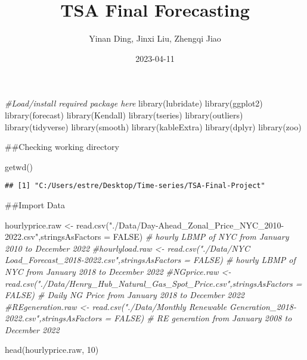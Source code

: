 \documentclass[
]{article}
\title{TSA Final Forecasting}
\author{Yinan Ding, Jinxi Liu, Zhengqi Jiao}
\date{2023-04-11}
\newenvironment{Shaded}{\begin{snugshade}}{\end{snugshade}}
\newcommand{\AttributeTok}[1]{\textcolor[rgb]{0.77,0.63,0.00}{#1}}
\newcommand{\CommentTok}[1]{\textcolor[rgb]{0.56,0.35,0.01}{\textit{#1}}}
\newcommand{\ConstantTok}[1]{\textcolor[rgb]{0.00,0.00,0.00}{#1}}
\newcommand{\DecValTok}[1]{\textcolor[rgb]{0.00,0.00,0.81}{#1}}
\newcommand{\FunctionTok}[1]{\textcolor[rgb]{0.00,0.00,0.00}{#1}}
\newcommand{\NormalTok}[1]{#1}
\newcommand{\OtherTok}[1]{\textcolor[rgb]{0.56,0.35,0.01}{#1}}
\newcommand{\StringTok}[1]{\textcolor[rgb]{0.31,0.60,0.02}{#1}}
\begin{document}
\maketitle

\begin{Shaded}
\begin{Highlighting}[]
\CommentTok{\#Load/install required package here}
\FunctionTok{library}\NormalTok{(lubridate)}
\FunctionTok{library}\NormalTok{(ggplot2)}
\FunctionTok{library}\NormalTok{(forecast)  }
\FunctionTok{library}\NormalTok{(Kendall)}
\FunctionTok{library}\NormalTok{(tseries)}
\FunctionTok{library}\NormalTok{(outliers)}
\FunctionTok{library}\NormalTok{(tidyverse)}
\FunctionTok{library}\NormalTok{(smooth)}
\FunctionTok{library}\NormalTok{(kableExtra)}
\FunctionTok{library}\NormalTok{(dplyr)}
\FunctionTok{library}\NormalTok{(zoo)}
\end{Highlighting}
\end{Shaded}

\#\#Checking working directory

\begin{Shaded}
\begin{Highlighting}[]
\FunctionTok{getwd}\NormalTok{()}
\end{Highlighting}
\end{Shaded}

\begin{verbatim}
## [1] "C:/Users/estre/Desktop/Time-series/TSA-Final-Project"
\end{verbatim}

\#\#Import Data

\begin{Shaded}
\begin{Highlighting}[]
\NormalTok{hourlyprice.raw }\OtherTok{\textless{}{-}} \FunctionTok{read.csv}\NormalTok{(}\StringTok{"./Data/Day{-}Ahead\_Zonal\_Price\_NYC\_2010{-}2022.csv"}\NormalTok{,}\AttributeTok{stringsAsFactors =} \ConstantTok{FALSE}\NormalTok{) }\CommentTok{\# hourly LBMP of NYC from January 2010 to December 2022}
\CommentTok{\#hourlyload.raw \textless{}{-} read.csv("./Data/NYC Load\_Forecast\_2018{-}2022.csv",stringsAsFactors = FALSE) \# hourly LBMP of NYC from January 2018 to December 2022}
\CommentTok{\#NGprice.raw \textless{}{-} read.csv("./Data/Henry\_Hub\_Natural\_Gas\_Spot\_Price.csv",stringsAsFactors = FALSE) \# Daily NG Price from January 2018 to December 2022}
\CommentTok{\#REgeneration.raw \textless{}{-} read.csv("./Data/Monthly Renewable Generation\_2018{-}2022.csv",stringsAsFactors = FALSE) \# RE generation from January 2008 to December 2022}

\FunctionTok{head}\NormalTok{(hourlyprice.raw, }\DecValTok{10}\NormalTok{)}
\end{Highlighting}
\end{Shaded}
\end{document}
